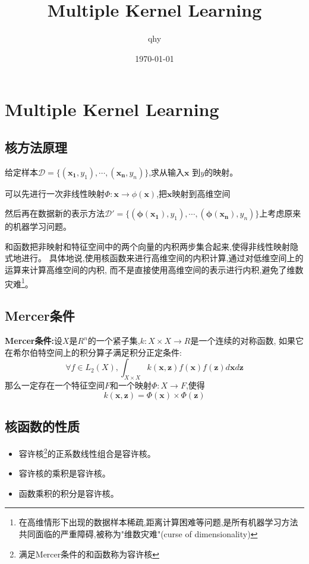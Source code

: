 \documentclass[UTF8,a4paper]{ctexart}
\author{qhy}
\date{\today}
\title{Multiple Kernel Learning}
\begin{document}
    \maketitle
    \tableofcontents
    \newpage
    \section{Multiple Kernel Learning}
        \subsection{核方法原理}
        给定样本$\mathcal{D} = \{(\bm{x_1} , y_1),\cdots,(\bm{x_n} , y_n)\}$,求从输入$\bm x$ 到$y$的映射。

        可以先进行一次非线性映射$\Phi:\bm x\to\phi(\bm x)$,把$\bm x$映射到高维空间

        然后再在数据新的表示方法$\mathcal{D'} = \{(\bm{\phi(x_1)} , y_1),\cdots,(\bm{\phi(x_n)} , y_n)\}$上考虑原来的机器学习问题。

        和函数把非映射和特征空间中的两个向量的内积两步集合起来,使得非线性映射隐式地进行。
        具体地说,使用核函数来进行高维空间的内积计算,通过对低维空间上的运算来计算高维空间的内积,
        而不是直接使用高维空间的表示进行内积,避免了维数灾难\footnote{在高维情形下出现的数据样本稀疏,距离计算困难等问题,是所有机器学习方法共同面临的严重障碍,被称为"维数灾难"(curse of dimensionality)}。

        \subsection{Mercer条件}
        \textbf{Mercer条件:}设$X$是$R^n$的一个紧子集,$k:X\times X \to R$是一个连续的对称函数,
        如果它在希尔伯特空间上的积分算子满足积分正定条件:
        \begin{equation}
            \forall f \in L_2(X) , \int_{X\times X} k(\bm x , \bm z)f(\bm x)f(\bm z)d\bm x d\bm z
        \end{equation}
        那么一定存在一个特征空间$F$和一个映射$\Phi:X\to F$,使得
        \begin{equation}
            k(\bm x, \bm z) = \Phi(\bm x)\times \Phi(\bm z)
        \end{equation}

        \subsection{核函数的性质}
        \begin{itemize}
            \item 容许核\footnote{满足Mercer条件的和函数称为容许核}的正系数线性组合是容许核。
            \item 容许核的乘积是容许核。
            \item 函数乘积的积分是容许核。
        \end{itemize}
\end{document}
